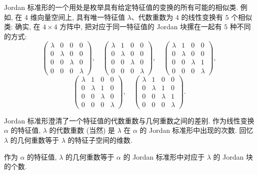 \begin{example}\label{ex:jordan-classes-count}
Jordan 标准形的一个用处是枚举具有给定特征值的变换的所有可能的相似类. 例如, 在 $4$ 维向量空间上, 具有唯一特征值 $\lambda$、代数重数为 $4$ 的线性变换有 $5$ 个相似类: 确实, 在 $4\times4$ 方阵中, 把对应于同一特征值的 Jordan 块摞在一起有 $5$ 种不同的方式:
\[
\begin{pmatrix}
\lambda&0&0&0\\
0&\lambda&0&0\\
0&0&\lambda&0\\
0&0&0&\lambda
\end{pmatrix},\quad
\begin{pmatrix}
\lambda&1&0&0\\
0&\lambda&0&0\\
0&0&\lambda&0\\
0&0&0&\lambda
\end{pmatrix},\quad
\begin{pmatrix}
\lambda&1&0&0\\
0&\lambda&0&0\\
0&0&\lambda&1\\
0&0&0&\lambda
\end{pmatrix},
\]
\[
\begin{pmatrix}
\lambda&1&0&0\\
0&\lambda&1&0\\
0&0&\lambda&0\\
0&0&0&\lambda
\end{pmatrix},\quad
\begin{pmatrix}
\lambda&1&0&0\\
0&\lambda&1&0\\
0&0&\lambda&1\\
0&0&0&\lambda
\end{pmatrix}.
\]
\end{example}

Jordan 标准形澄清了一个特征值的代数重数与几何重数之间的差别. 作为线性变换 $\alpha$ 的特征值, $\lambda$ 的代数重数 (当然) 是 $\lambda$ 在 $\alpha$ 的 Jordan 标准形中出现的次数. 回忆 $\lambda$ 的几何重数等于 $\lambda$ 的特征子空间的维数.

\begin{proposition}\label{prop:geometric-mult-jordan-blocks}
作为 $\alpha$ 的特征值, $\lambda$ 的几何重数等于 $\alpha$ 的 Jordan 标准形中对应于 $\lambda$ 的 Jordan 块的个数.
\end{proposition}

